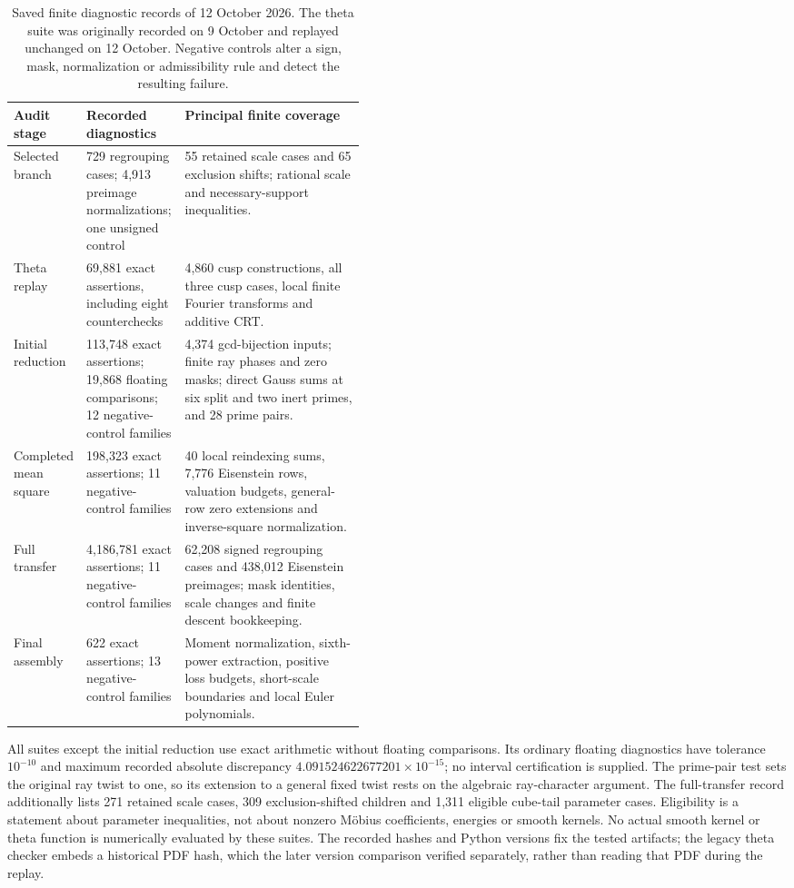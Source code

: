 \documentclass[11pt]{article}
\numberwithin{equation}{section}
\theoremstyle{definition}
\theoremstyle{remark}
\begin{document}
\begin{table}[htbp]
\centering
\small
\setlength{\tabcolsep}{4pt}
\renewcommand{\arraystretch}{1.12}
\begin{tabularx}{\linewidth}{@{}p{0.16\linewidth}p{0.29\linewidth}X@{}}
\toprule
Audit stage & Recorded diagnostics & Principal finite coverage \\
\midrule
Selected branch & 729 regrouping cases; 4,913 preimage normalizations;
one unsigned control
& 55 retained scale cases and 65 exclusion shifts; rational scale and
necessary-support inequalities. \\
Theta replay & 69,881 exact assertions, including eight counterchecks
& 4,860 cusp constructions, all three cusp cases, local finite
Fourier transforms and additive CRT. \\
Initial reduction & 113,748 exact assertions; 19,868 floating comparisons;
12 negative-control families
& 4,374 gcd-bijection inputs; finite ray phases and zero masks; direct
Gauss sums at six split and two inert primes, and 28 prime pairs. \\
Completed mean square & 198,323 exact assertions; 11 negative-control families
& 40 local reindexing sums, 7,776 Eisenstein rows, valuation budgets,
general-row zero extensions and inverse-square normalization. \\
Full transfer & 4,186,781 exact assertions; 11 negative-control families
& 62,208 signed regrouping cases and 438,012 Eisenstein preimages;
mask identities, scale changes and finite descent bookkeeping. \\
Final assembly & 622 exact assertions; 13 negative-control families
& Moment normalization, sixth-power extraction, positive loss budgets,
short-scale boundaries and local Euler polynomials. \\
\bottomrule
\end{tabularx}
\caption{Saved finite diagnostic records of 12 October 2026. The theta
suite was originally recorded on 9 October and replayed unchanged on
12 October. Negative controls alter a sign, mask, normalization or
admissibility rule and detect the resulting failure.}
\label{tab:finite-audit}
\end{table}

All suites except the initial reduction use exact arithmetic without
floating comparisons. Its ordinary floating diagnostics have tolerance
$10^{-10}$ and maximum recorded absolute discrepancy
$4.091524622677201\times10^{-15}$; no interval certification is supplied.
The prime-pair test sets the original ray twist to one, so its extension
to a general fixed twist rests on the algebraic ray-character argument.
The full-transfer record additionally lists 271 retained scale cases,
309 exclusion-shifted children and 1,311 eligible cube-tail parameter
cases. Eligibility is a statement about parameter inequalities, not
about nonzero M\"obius coefficients, energies or smooth kernels. No
actual smooth kernel or theta function is numerically evaluated by these
suites. The recorded hashes and Python versions fix the tested artifacts;
the legacy theta checker embeds a historical PDF hash, which the later
version comparison verified separately, rather than reading that PDF
during the replay.
\end{document}
